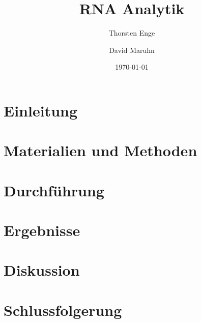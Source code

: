 \documentclass{article}
\title{RNA Analytik}
\author{Thorsten Enge \and David Maruhn}
\date{\today}
\begin{document}
\maketitle

\tableofcontents
\newpage

\section{Einleitung}

\section{Materialien und Methoden}

\section{Durchführung}



\section{Ergebnisse}

\section{Diskussion}

\section{Schlussfolgerung}



\end{document}
